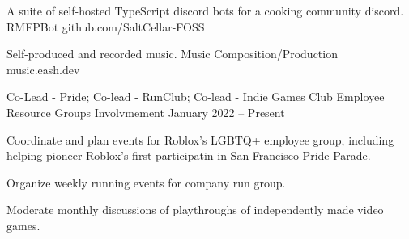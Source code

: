 \documentclass[]{awesome-cv}
\begin{document}
	\vspace{-6mm}
	\cventry
	{A suite of self-hosted TypeScript discord bots for a cooking community discord.}
	{RMFPBot}
	{github.com/SaltCellar-FOSS}
	{}
	{}

	\vspace{-6mm}
	\cventry
	{Self-produced and recorded music.}
	{Music Composition/Production}
	{music.eash.dev}
	{}
	{}
	
	\vspace{-5mm}
	

\vspace{-2mm}
\vspace{-2mm}
	\cventry
	{Co-Lead - Pride; Co-lead - RunClub; Co-lead - Indie Games Club}
	{Employee Resource Groups Involvmement}
	{}
	{January 2022 – Present}
	{\begin{cvitems}
		\item {Coordinate and plan events for Roblox's LGBTQ+ employee group, including helping pioneer Roblox's first participatin in San Francisco Pride Parade.}
		\item {Organize weekly running events for company run group.}
		\item {Moderate monthly discussions of playthroughs of independently made video games.}
		\end{cvitems}}

	\vspace{-4mm}

	
\end{document}
